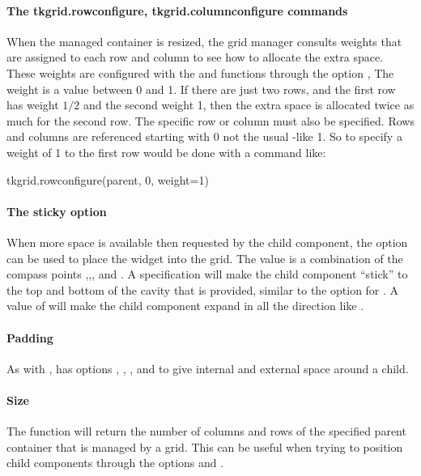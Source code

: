 \paragraph{The tkgrid.rowconfigure, tkgrid.columnconfigure commands}
When the managed container is resized, the grid manager consults
weights that are assigned to each row and column to see how to
allocate the extra space. These weights are configured with the
 and 
functions through the option
, The weight is a value
between 0 and 1. If there are just two rows, and the first row has weight
$1/2$ and the second weight 1, then the extra space is allocated twice
as much for the second row. The specific row or column must also be
specified. Rows and columns are referenced starting with 0 not the usual \R-like 1. So to specify
a weight of 1 to the first row would be done with a command like:


\begin{Schunk}
\begin{Sinput}
 tkgrid.rowconfigure(parent, 0, weight=1)
\end{Sinput}
\end{Schunk}

\paragraph{The sticky option}
When more space is available then requested by the child component,
the  option can be used to place the widget
into the grid. The value is a combination of the compass points
,,, and . A specification
 will make the child component ``stick'' to the top and
bottom of the cavity that is provided, similar to the 
option for . A value of  will make the
child component expand in all the direction like .

\paragraph{Padding}
As with ,  has options
, , ,
and  to give internal and external space around a
child.

\paragraph{Size}
The function  will return the number of columns and rows of the specified parent container that is managed by a grid. This can be useful when trying to position child components through the options  and .

